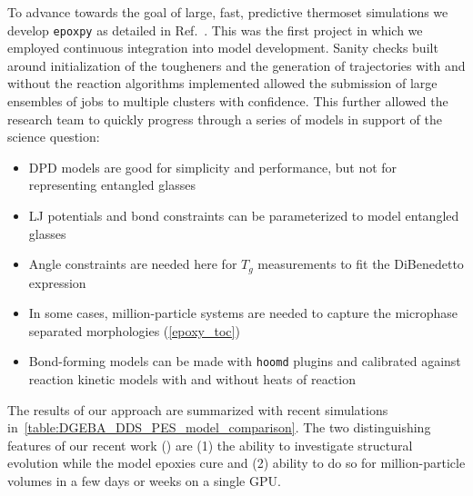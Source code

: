 To advance towards the goal of large, fast, predictive thermoset simulations we develop \texttt{epoxpy} as detailed in Ref.~\cite{epoxpy}.
This was the first project in which we employed continuous integration into model development.
Sanity checks built around initialization of the tougheners and the generation of trajectories with and without the reaction algorithms implemented allowed the submission of large ensembles of jobs to multiple clusters with confidence. 
This further allowed the research team to quickly progress through a series of models in support of the science question:
\begin{itemize}
    \item DPD models are good for simplicity and performance, but not for representing entangled glasses
    \item LJ potentials and bond constraints can be parameterized to model entangled glasses
    \item Angle constraints are needed here for $T_g$ measurements to fit the DiBenedetto expression
    \item In some cases, million-particle systems are needed to capture the microphase separated morphologies (\autoref{epoxy_toc})
    \item Bond-forming models can be made with \texttt{hoomd} plugins and calibrated against reaction kinetic models with and without heats of reaction
\end{itemize}
The results of our approach are summarized with recent simulations in~\autoref{table:DGEBA_DDS_PES_model_comparison}.
The two distinguishing features of our recent work (\cite{epoxpy}) are (1) the ability to investigate structural evolution while the model epoxies cure and (2) ability to do so for million-particle volumes in a few days or weeks on a single GPU.

